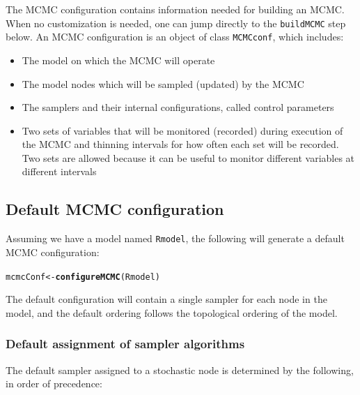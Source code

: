 \documentclass[12pt,oneside]{book}\usepackage[]{graphicx}\usepackage[]{color}
\makeatletter
\newcommand{\hlstd}[1]{\textcolor[rgb]{0.345,0.345,0.345}{#1}}%
\newcommand{\hlkwb}[1]{\textcolor[rgb]{0.69,0.353,0.396}{#1}}%
\newcommand{\hlkwd}[1]{\textcolor[rgb]{0.737,0.353,0.396}{\textbf{#1}}}%
\newenvironment{kframe}{%
 \def\at@end@of@kframe{}%
 \ifinner\ifhmode%
  \def\at@end@of@kframe{\end{minipage}}%
  \begin{minipage}{\columnwidth}%
 \fi\fi%
 \def\FrameCommand##1{\hskip\@totalleftmargin \hskip-\fboxsep
 \colorbox{shadecolor}{##1}\hskip-\fboxsep
     \hskip-\linewidth \hskip-\@totalleftmargin \hskip\columnwidth}%
 \MakeFramed {\advance\hsize-\width
   \@totalleftmargin\z@ \linewidth\hsize
   \@setminipage}}%
 {\par\unskip\endMakeFramed%
 \at@end@of@kframe}
\newenvironment{knitrout}{}{} %
\def\cd#1{\texttt{#1}}
\makeatother
\begin{document}
The MCMC configuration contains information needed for building an MCMC.  When no customization is needed, one can jump directly to the \cd{buildMCMC} step below.  An MCMC configuration is an object of class \cd{MCMCconf}, which includes:

\begin{itemize}
    \item The model on which the MCMC will operate
    \item The model nodes which will be sampled (updated) by the MCMC
    \item The samplers and their internal configurations, called control parameters
    \item Two sets of variables that will be monitored (recorded) during execution of the MCMC and thinning intervals for how often each set will be recorded. Two sets are allowed because it can be useful to monitor different variables at different intervals
\end{itemize}

\subsection{Default MCMC configuration}
\label{sec:default-mcmc-conf}

Assuming we have a model named \cd{Rmodel}, the following will generate a default MCMC configuration:
\begin{knitrout}
\color{fgcolor}\begin{kframe}
\begin{alltt}
\hlstd{mcmcConf} \hlkwb{<-} \hlkwd{configureMCMC}\hlstd{(Rmodel)}
\end{alltt}
\end{kframe}
\end{knitrout}

The default configuration will contain a single sampler for each node in the model, and the default ordering follows the topological ordering of the model.

\subsubsection{Default assignment of sampler algorithms}

The default sampler assigned to a stochastic node is determined by the following, in order of precedence:
\end{document}

